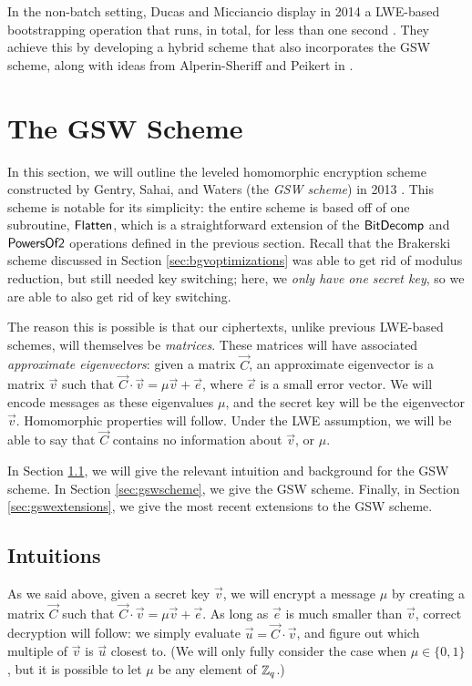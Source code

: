     In the non-batch setting, Ducas and Micciancio display in 2014 a LWE-based bootstrapping operation that runs, in total, for less than one second \cite{Ducas2015}. They achieve this by developing a hybrid scheme that also incorporates the GSW scheme, along with ideas from Alperin-Sheriff and Peikert in \cite{A2014}.



\section{The GSW Scheme} \label{sec:gsw}
In this section, we will outline the leveled homomorphic encryption scheme constructed by Gentry, Sahai, and Waters (the \emph{GSW scheme}) in 2013 \cite{gsw}. This scheme is notable for its simplicity: the entire scheme is based off of one subroutine, ${\sf Flatten}$, which is a straightforward extension of the ${\sf BitDecomp}$ and ${\sf PowersOf2}$ operations defined in the previous section. Recall that the Brakerski scheme discussed in Section \ref{sec:bgvoptimizations} was able to get rid of modulus reduction, but still needed key switching; here, we \emph{only have one secret key}, so we are able to also get rid of key switching.

The reason this is possible is that our ciphertexts, unlike previous LWE-based schemes, will themselves be \emph{matrices}. These matrices will have associated \emph{approximate eigenvectors}: given a matrix $\vec{C}$, an approximate eigenvector is a matrix $\vec{v}$ such that $\vec{C} \cdot \vec{v} = \mu \vec{v} + \vec{e}$, where $\vec{e}$ is a small error vector. We will encode messages as these eigenvalues $\mu$, and the secret key will be the eigenvector $\vec{v}$. Homomorphic properties will follow. Under the LWE assumption, we will be able to say that $\vec{C}$ contains no information about $\vec{v}$, or $\mu$.

In Section \ref{sec:gswintuition}, we will give the relevant intuition and background for the GSW scheme. In Section \ref{sec:gswscheme}, we give the GSW scheme. Finally, in Section \ref{sec:gswextensions}, we give the most recent extensions to the GSW scheme.

\subsection{Intuitions} \label{sec:gswintuition}

    As we said above, given a secret key $\vec{v}$, we will encrypt a message $\mu$ by creating a matrix $\vec{C}$ such that $\vec{C} \cdot \vec{v} = \mu \vec{v} + \vec{e}$. As long as $\vec{e}$ is much smaller than $\vec{v}$, correct decryption will follow: we simply evaluate $\vec{u} = \vec{C} \cdot \vec{v}$, and figure out which multiple of $\vec{v}$ is $\vec{u}$ closest to.
    (We will only fully consider the case when $\mu \in \{0, 1\}$, but it is possible to let $\mu$ be any element of $\mathbb{Z}_q$.)

